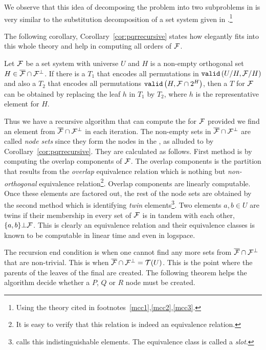 We observe that this idea of decomposing the \COP problem into two
subproblems in \cite{mm96} is very similar to the substitution
decomposition of a set system given in \cite[Sec.~4]{mcc04}.\footnote{Using
  the theory cited in footnotes~\ref{mcc1},\ref{mcc2},\ref{mcc3}.}

The following corollary, Corollary~\ref{cor:pqrrecursive} states how
\PQRtree elegantly fits into this whole theory and help in computing
all \COP orders of ${\cal F}$.

\begin{corollary}[{\cite[Cor.~8]{mm96}}]
  \label{cor:pqrrecursive}
  Let ${\cal F}$ be a set system with universe $U$ and $H$ is a non-empty
  orthogonal set $H \in \overline{{\cal F}} \cap {\cal F}^{\bot}$. If there is a \PQRtree $T_1$ that
  encodes all permutations in ${\tt valid}\left(U/H, {\cal F}/H\right)$ and also a \PQRtree
  $T_2$ that encodes all permutations ${\tt valid}\left(H,{\cal F} \cap 2^{H}\right)$,
  then a \PQRtree $T$ for ${\cal F}$ can be obtained by replacing the leaf
  $h$ in $T_1$ by $T_2$, where $h$ is the representative element for $H$.
\end{corollary}


Thus we have a recursive algorithm that can compute the \PQRtree for
${\cal F}$ provided we find an element from $\overline{{\cal F}} \cap {\cal F}^{\bot}$ in each iteration. The
non-empty sets in $\overline{{\cal F}} \cap {\cal F}^{\bot}$ are called {\em node sets} since they form the
nodes in the \PQRtree, as alluded to by
Corollary~\ref{cor:pqrrecursive}. They are calculated as follows.
First method is by computing the overlap components of ${\cal F}$. The
overlap components is the partition that results from the {\em
  overlap} equivalence relation which is nothing but {\em
  non-orthogonal} equivalence relation\footnote{It is easy to verify
  that this relation is indeed an equivalence relation.}. Overlap
components are linearly computable\cite{mm95,wlh92}. Once these
elements are factored out, the rest of the node sets are obtained by
the second method which is identifying {\em twin}
elements\footnote{\cite[Sec.~3]{kklv10} calls this {indistinguishable}
  elements. The equivalence class is called a {\em slot}.}. Two
elements $a, b \in U$ are twins if their membership in every set of
${\cal F}$ is in tandem with each other, \ie $\{a,b\} \bot {\cal F}$. This is
clearly an equivalence relation and their equivalence classes is known
to be computable in linear time\cite{wlh01,mm96-ref11} and even in
logspace\cite{kklv10}.

The recursion end condition is when one cannot find any more sets from
$\overline{{\cal F}} \cap {\cal F}^{\bot}$ that are non-trivial. This is when $\overline{{\cal F}} \cap {\cal F}^{\bot} = {\cal T}(U)$. This is the
point where the parents of the leaves of the final \PQRtree are created. The
following theorem helps the algorithm decide whether a $P$, $Q$ or
$R$ node must be created.

